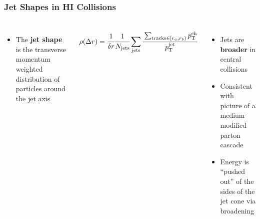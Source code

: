 \begin{frame}

  \frametitle{\textbf{Jet Shapes in HI Collisions}}

  \begin{columns}

    \begin{itemize}
    \item The \textbf{jet shape} is the transverse momentum weighted distribution of particles around the jet axis
    \end{itemize}
    \begin{align*}
      \rho(\Delta r) = \cfrac{1}{\delta r} \cfrac{1}{N_{\text{jets}}} \sum_{\text{jets}} \cfrac{\sum_{\text{tracks} \in [r_a, r_b)} p_{\text{T}}^{\text{ch}}}{p_{\text{T}}^{\text{jet}}}
    \end{align*}
    \begin{itemize}
    \item Jets are \textbf{broader} in central collisions
    \item Consistent with picture of a medium-modified parton cascade
    \item Energy is ``pushed out'' of the sides of the jet cone via broadening
    \end{itemize}
    

    \centering

    
    

  \end{columns}






\end{frame}
